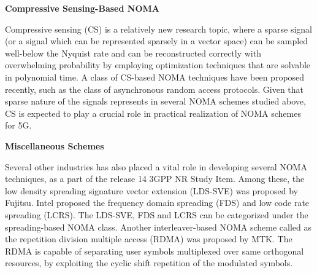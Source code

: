 \begin{multicols}{2}
\bigskip
\noindent
{\bf Compressive Sensing-Based NOMA}


Compressive sensing (CS) is a relatively new research topic, where a sparse signal (or a signal which can be represented sparsely in a vector space) can be sampled well-below the Nyquist rate and can be reconstructed correctly with overwhelming probability by employing optimization techniques that are solvable in polynomial time. A class of CS-based NOMA techniques have been proposed recently, such as the class of asynchronous random access protocols. Given that sparse nature of the signals represents in several NOMA schemes studied above, CS is expected to play a crucial role in practical realization of NOMA schemes for 5G.

\smallskip
\noindent
{\bf Miscellaneous Schemes}

Several other industries has also placed a vital role in developing several NOMA techniques, as a part of the release 14 3GPP NR Study Item. Among these, the low density spreading signature vector extension (LDS-SVE) was proposed by Fujitsu. Intel proposed the frequency domain spreading (FDS) and low code rate spreading (LCRS). The LDS-SVE, FDS and LCRS can be categorized under the spreading-based NOMA class. Another interleaver-based NOMA scheme called as the repetition division multiple access (RDMA) was proposed by MTK. The RDMA is capable of separating user symbols multiplexed over same orthogonal resources, by exploiting the cyclic shift repetition of the modulated symbols.


\end{multicols}
